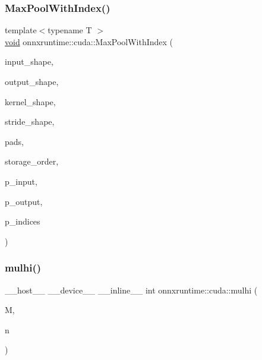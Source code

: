 \mbox{\label{namespaceonnxruntime_1_1cuda_af278cd2a5888f6ee33d879ce0d43fd6f}} 
\subsubsection{\texorpdfstring{Max\+Pool\+With\+Index()}{MaxPoolWithIndex()}}
{\footnotesize\ttfamily template$<$typename T $>$ \\
\mbox{\hyperlink{mlasi_8h_a88f941d423cb2a819b70a1358982b1a6}{void}} onnxruntime\+::cuda\+::\+Max\+Pool\+With\+Index (\begin{DoxyParamCaption}\item[{const \mbox{\hyperlink{classonnxruntime_1_1TensorShape}{Tensor\+Shape}} \&}]{input\+\_\+shape,  }\item[{const \mbox{\hyperlink{classonnxruntime_1_1TensorShape}{Tensor\+Shape}} \&}]{output\+\_\+shape,  }\item[{const std\+::vector$<$ int64\+\_\+t $>$ \&}]{kernel\+\_\+shape,  }\item[{const std\+::vector$<$ int64\+\_\+t $>$ \&}]{stride\+\_\+shape,  }\item[{const std\+::vector$<$ int64\+\_\+t $>$ \&}]{pads,  }\item[{int64\+\_\+t}]{storage\+\_\+order,  }\item[{const T $\ast$}]{p\+\_\+input,  }\item[{T $\ast$}]{p\+\_\+output,  }\item[{int64\+\_\+t $\ast$}]{p\+\_\+indices }\end{DoxyParamCaption})}

\mbox{\label{namespaceonnxruntime_1_1cuda_a22b8733c4c436accb3315fd80dea8932}} 
\subsubsection{\texorpdfstring{mulhi()}{mulhi()}}
{\footnotesize\ttfamily \+\_\+\+\_\+host\+\_\+\+\_\+ \+\_\+\+\_\+device\+\_\+\+\_\+ \+\_\+\+\_\+inline\+\_\+\+\_\+ int onnxruntime\+::cuda\+::mulhi (\begin{DoxyParamCaption}\item[{const int}]{M,  }\item[{const int}]{n }\end{DoxyParamCaption})}


